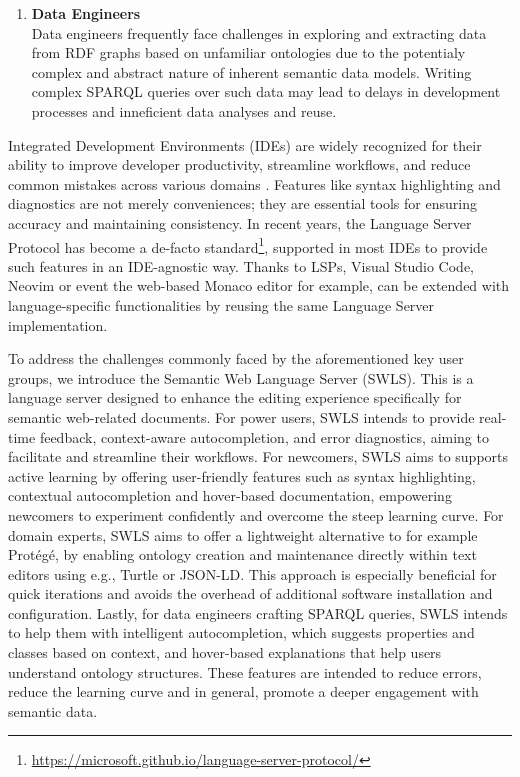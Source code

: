 \begin{enumerate}
  \item \textbf{Data Engineers}\\
    Data engineers frequently face challenges in exploring and extracting data from RDF graphs based on unfamiliar ontologies due to the potentialy complex and abstract nature of inherent semantic data models.
    Writing complex SPARQL queries over such data may lead to delays in development processes and inneficient data analyses and reuse. 
\end{enumerate}

Integrated Development Environments (IDEs) are widely recognized for their ability to improve developer productivity, streamline workflows, and reduce common mistakes across various domains \cite{javaEngineer}. 
Features like syntax highlighting and diagnostics are not merely conveniences; they are essential tools for ensuring accuracy and maintaining consistency. 
In recent years, the Language Server Protocol has become a de-facto standard\footnote{\url{https://microsoft.github.io/language-server-protocol/}}, supported in most IDEs to provide such features in an IDE-agnostic way.
Thanks to LSPs, Visual Studio Code, Neovim or event the web-based Monaco editor for example, can be extended with language-specific functionalities by reusing the same Language Server implementation.

To address the challenges commonly faced by the aforementioned key user groups, we introduce the Semantic Web Language Server (SWLS).
This is a language server designed to enhance the editing experience specifically for semantic web-related documents. 
For power users, SWLS intends to provide real-time feedback, context-aware autocompletion, and error diagnostics, aiming to facilitate and streamline their workflows.
For newcomers, SWLS aims to supports active learning by offering user-friendly features such as syntax highlighting, contextual autocompletion and hover-based documentation, empowering newcomers to experiment confidently and overcome the steep learning curve.
For domain experts, SWLS aims to offer a lightweight alternative to for example Protégé, by enabling ontology creation and maintenance directly within text editors using e.g., Turtle or JSON-LD.
This approach is especially beneficial for quick iterations and avoids the overhead of additional software installation and configuration.
Lastly, for data engineers crafting SPARQL queries, SWLS intends to help them with intelligent autocompletion, which suggests properties and classes based on context, and hover-based explanations that help users understand ontology structures.
These features are intended to reduce errors, reduce the learning curve and in general, promote a deeper engagement with semantic data.

